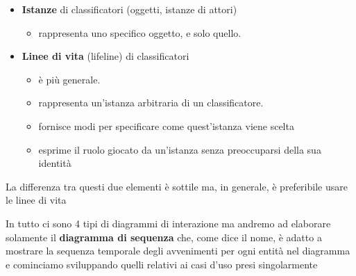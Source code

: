 \documentclass[a4paper, 11pt,oneside]{book}
\newcommand{\spacing}{\par\bigskip\noindent}
\begin{document}
    \begin{itemize}
        \item \textbf{Istanze} di classificatori (oggetti, istanze di attori)
            \begin{itemize}
                \item rappresenta uno specifico oggetto, e solo quello.
            \end{itemize}
        \item \textbf{Linee di vita} (lifeline) di classificatori
            \begin{itemize}
                \item è più generale.
                \item rappresenta un'istanza arbitraria di un classificatore.
                \item fornisce modi per specificare come quest'istanza viene scelta
                \item esprime il ruolo giocato da un'istanza senza preoccuparsi della sua identità
            \end{itemize}
    \end{itemize}
    La differenza tra questi due elementi è sottile ma, in generale, è preferibile usare le linee di vita
    \spacing
    In tutto ci sono 4 tipi di diagrammi di interazione ma andremo ad elaborare solamente il \textbf{diagramma di sequenza} che, come dice il nome, è adatto a mostrare la sequenza
    temporale degli avvenimenti per ogni entità nel diagramma e cominciamo sviluppando quelli relativi ai casi d'uso presi singolarmente
    \spacing
\end{document}
